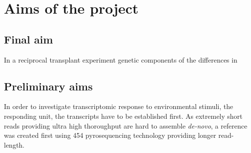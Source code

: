
\chapter{Aims of the project} %


\section{Final aim}

In a reciprocal transplant experiment genetic components of the
differences in 







\section{Preliminary aims}

In order to investigate transcriptomic response to environmental
stimuli, the responding unit, the transcripts have to be established
first. As extremely short reads providing ultra high thoroughput are
hard to assemble \textit{de-novo}, a reference was created first using
454 pyrosequencing technology providing longer read-length.




     